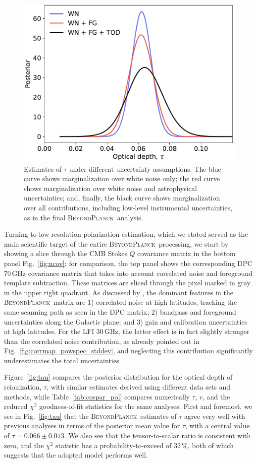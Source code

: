 \documentclass[onecolumn]{aa}
\newcommand{\BP}{\textsc{BeyondPlanck}}
\begin{document}
\begin{figure}[t]
	\center
	\includegraphics[width=0.5\linewidth]{figs/BP10_tau_syst_assess.pdf}
        \caption{Estimates of $\tau$ under different uncertainty
          assumptions. The blue curve shows marginalization over white
          noise only; the red 
          curve shows marginalization over white noise and
          astrophysical uncertainties; and, finally, the black curve
          shows marginalization over all contributions, including
          low-level instrumental uncertainties, as in the
          final \BP\ analysis.}
	\label{fig:tau_assess}
\end{figure}



Turning to low-resolution polarization estimation, which we stated
served as the main scientific target of the entire \BP\ processing, we
start by showing a slice through the CMB Stokes $Q$ covariance matrix
in the bottom panel Fig.~\ref{fig:ncov}; for comparison, the top panel
shows the corresponding DPC 70\,GHz covariance matrix that takes into
account correlated noise and foreground template subtraction. These
matrices are sliced through the pixel marked in gray in the upper
right quadrant. As discussed by \citet{bp11}, the dominant features in
the \BP\ matrix are 1) correlated noise at high latitudes, tracking
the same scanning path as seen in the DPC matrix; 2) bandpass and
foreground uncertainties along the Galactic plane; and 3) gain and
calibration uncertainties at high latitudes. For the LFI 30\,GHz, the
latter effect is in fact slightly stronger than the correlated noise
contribution, as already pointed out in
Fig.~\ref{fig:corrmap_powspec_stddev}, and neglecting this
contribution significantly underestimates the total uncertainties.

Figure~\ref{fig:tau} compares the posterior distribution for the
optical depth of reionization, $\tau$, with similar estimates derived
using different data sets and methods, while
Table~\ref{tab:cospar_pol} compares numerically $\tau$, $r$, and the
reduced $\chi^2$ goodness-of-fit statistics for the same
analyses. First and foremost, we see in Fig.~\ref{fig:tau} that the
\BP\ estimates of $\tau$ agree very well with previous analyses in
terms of the posterior mean value for $\tau$, with a central value of
$\tau=0.066\pm0.013$. We also see that the tensor-to-scalar ratio is
consistent with zero, and the $\chi^2$ statistic has a
probability-to-exceed of 32\,\%, both of which suggests that the
adopted model performs well.
\end{document}
